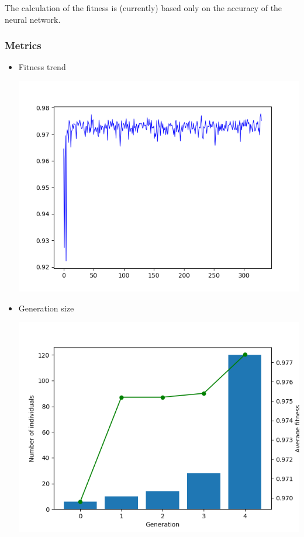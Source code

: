 \documentclass[11pt]{article}
\makeatletter
\def\maxwidth{\ifdim\Gin@nat@width>\linewidth\linewidth
    \else\Gin@nat@width\fi}
\let\Oldincludegraphics\includegraphics
\renewcommand{\includegraphics}[1]{\Oldincludegraphics[width=.8\maxwidth]{#1}}
\providecommand{\tightlist}{%
      \setlength{\itemsep}{0pt}\setlength{\parskip}{0pt}}
\makeatother
\begin{document}
The calculation of the fitness is (currently) based only on the accuracy
of the neural network.

\hypertarget{metrics}{%
\subsubsection{Metrics}\label{metrics}}

\begin{itemize}
\tightlist
\item
  Fitness trend

  \includegraphics{gfx/fitness-trend-tne-1.png}
\item
  Generation size

  \includegraphics{gfx/generation-size-tne-1.png}
\end{itemize}
\end{document}
